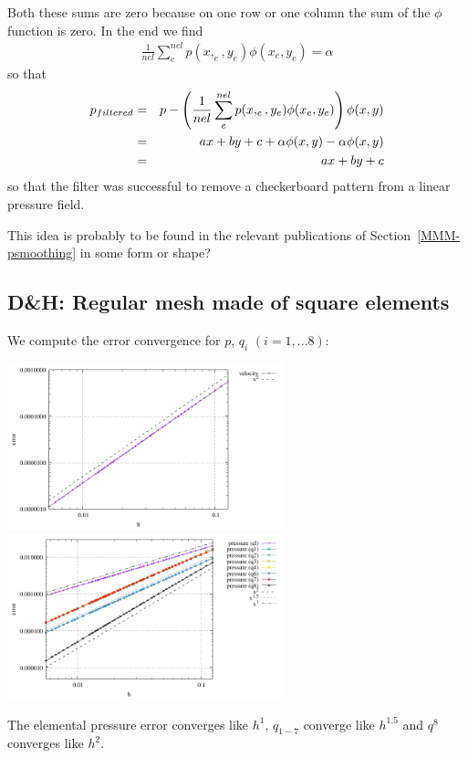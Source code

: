 Both these sums are zero because on one row or one column the sum of the $\phi$ function is zero. 
In the end we find
\begin{eqnarray}
\frac{1}{nel} \sum_e^{nel} p(x,_e,y_e) \phi(x_e,y_e)  = \alpha 
\end{eqnarray}
so that 
\begin{eqnarray}
p_{filtered} 
&=& p - \left( \frac{1}{nel} \sum_e^{nel} p(x,_e,y_e) \phi(x_e,y_e) \right)  \phi(x,y) \nonumber\\
&=& ax+by+c + \alpha \phi(x,y) - \alpha  \phi(x,y) \nonumber\\
&=& ax+by+c 
\end{eqnarray}
so that the filter was successful to remove a checkerboard pattern from a linear pressure field.


\begin{remark}
This idea is probably to be found in the relevant publications of Section~\ref{MMM-psmoothing}
in some form or shape? 
\end{remark}

\newpage
\subsection*{D\&H: Regular mesh made of square elements}

We compute the error convergence for $p$, $q_i$ $(i=1,...8)$:
\begin{center}
\includegraphics[width=8cm]{python_codes/fieldstone_12/results/reg/errorsV}
\includegraphics[width=8cm]{python_codes/fieldstone_12/results/reg/errorsP}
\end{center}
The elemental pressure error converges like $h^1$, $q_{1-7}$ converge like $h^{1.5}$ and 
$q^8$ converges like $h^2$.

